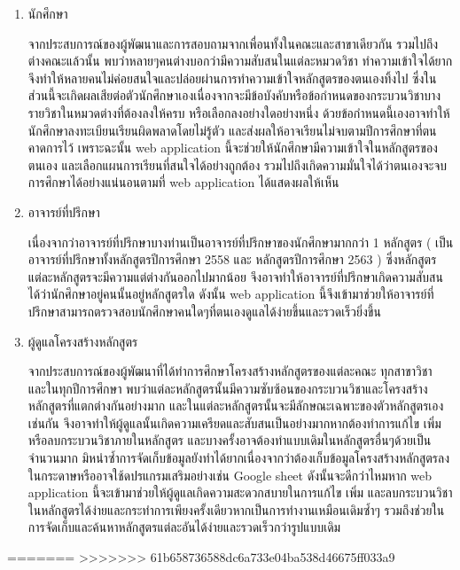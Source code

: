 \begin{enumerate}
    \item นักศึกษา 
	
    จากประสบการณ์ของผู้พัฒนาและการสอบถามจากเพื่อนทั้งในคณะและสาขาเดียวกัน รวมไปถึงต่างคณะแล้วนั้น พบว่าหลายๆคนต่างบอกว่ามีความสับสนในแต่ละหมวดวิชา ทำความเข้าใจได้ยาก จึงทำให้หลายคนไม่ค่อยสนใจและปล่อยผ่านการทำความเข้าใจหลักสูตรของตนเองทิ้งไป  ซึ่งในส่วนนี้จะเกิดผลเสียต่อตัวนักศึกษาเองเนื่องจากจะมีข้อบังคับหรือข้อกำหนดของกระบวนวิชาบางรายวิชาในหมวดต่างที่ต้องลงให้ครบ หรือเลือกลงอย่างใดอย่างหนึ่ง ด้วยข้อกำหนดนี้เองอาจทำให้นักศึกษาลงทะเบียนเรียนผิดพลาดโดยไม่รู้ตัว และส่งผลให้อาจเรียนไม่จบตามปีการศึกษาที่ตนคาดการไว้ เพราะฉะนั้น web application นี้จะช่วยให้นักศึกษามีความเข้าใจในหลักสูตรของตนเอง และเลือกแผนการเรียนที่สนใจได้อย่างถูกต้อง รวมไปถึงเกิดความมั่นใจได้ว่าตนเองจะจบการศึกษาได้อย่างแน่นอนตามที่ web application ได้แสดงผลให้เห็น  

    
    \item อาจารย์ที่ปรึกษา 
	
    เนื่องจากว่าอาจารย์ที่ปรึกษาบางท่านเป็นอาจารย์ที่ปรึกษาของนักศึกษามากกว่า 1 หลักสูตร ( เป็นอาจารย์ที่ปรึกษาทั้งหลักสูตรปีการศึกษา 2558 และ หลักสูตรปีการศึกษา 2563 ) ซึ่งหลักสูตรแต่ละหลักสูตรจะมีความแต่ต่างกันออกไปมากน้อย จึงอาจทำให้อาจารย์ที่ปรึกษาเกิดความสับสนได้ว่านักศึกษาอยู่คนนั้นอยู่หลักสูตรใด ดังนั้น web application นี้จึงเข้ามาช่วยให้อาจารย์ที่ปรึกษาสามารถตรวจสอบนักศึกษาคนใดๆที่ตนเองดูแลได้ง่ายขึ้นและรวดเร็วยิ่งขึ้น

   
    \item ผู้ดูแลโครงสร้างหลักสูตร 
	
    จากประสบการณ์ของผู้พัฒนาที่ได้ทำการศึกษาโครงสร้างหลักสูตรของแต่ละคณะ ทุกสาขาวิชา และในทุกปีการศึกษา พบว่าแต่ละหลักสูตรนั้นมีความซับซ้อนของกระบวนวิชาและโครงสร้างหลักสูตรที่แตกต่างกันอย่างมาก และในแต่ละหลักสูตรนั้นจะมีลักษณะเฉพาะของตัวหลักสูตรเองเช่นกัน จึงอาจทำให้ผู้ดูแลนั้นเกิดความเครียดและสับสนเป็นอย่างมากหากต้องทำการแก้ไข เพิ่ม หรือลบกระบวนวิชาภายในหลักสูตร และบางครั้งอาจต้องทำแบบเดิมในหลักสูตรอื่นๆด้วยเป็นจำนวนมาก มิหนำซ้ำการจัดเก็บข้อมูลยังทำได้ยากเนื่องจากว่าต้องเก็บข้อมูลโครงสร้างหลักสูตรลงในกระดาษหรืออาจใช้ดปรแกรมเสริมอย่างเช่น Google sheet ดังนั้นจะดีกว่าไหมหาก web application นี้จะเข้ามาช่วยให้ผู้ดูแลเกิดความสะดวกสบายในการแก้ไข เพิ่ม และลบกระบวนวิชาในหลักสูตรได้ง่ายและกระทำการเพียงครั้งเดียวหากเป็นการทำงานเหมือนเดิมซ้ำๆ รวมถึงช่วยในการจัดเก็บและค้นหาหลักสูตรแต่ละอันได้ง่ายและรวดเร็วกว่ารูปแบบเดิม   
\end{enumerate}
=======
>>>>>>> 61b658736588dc6a733e04ba538d46675ff033a9
